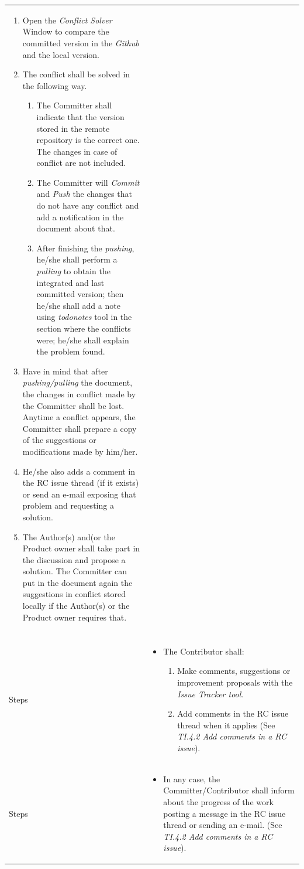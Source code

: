 \documentclass{template/openetcs_article}
\begin{document}
\begin{flushleft}
\begin{supertabular}{|m{2cm}|m{13cm}|}
\begin{itemize}
\begin{itemize}
\begin{enumerate}
\item Open the {\it Conflict Solver} Window to compare the committed version in the {\it Github} and the local version. 
\item The conflict shall be solved in the following way.
\begin{enumerate}
\item The Committer shall indicate that the version stored in the remote repository is the correct one. The changes in case of conflict are not included. 
\item The Committer will {\it Commit} and {\it Push} the changes that do not have any conflict and add a notification in the document about that. 
\item After finishing the {\it pushing}, he/she shall perform a {\it pulling} to obtain the integrated and last committed version; then he/she shall add a note using {\it todonotes} tool in the section where the conflicts were; he/she shall explain the problem found. 
\end{enumerate}
\item Have in mind that after {\it pushing/pulling} the document, the changes in conflict made by the Committer shall be lost. Anytime a conflict appears, the Committer shall prepare a copy of the suggestions or modifications made by him/her.
\item He/she also adds a comment in the RC issue thread (if it exists) or send an e-mail exposing that problem and requesting a solution.
\item The Author(s) and(or the Product owner shall take part in the discussion and propose a solution. The Committer can put in the document again the suggestions in conflict stored locally if the Author(s) or the Product owner requires that.
\end{enumerate}
\end{itemize}
\end{itemize}
\\\\\hline
Steps &
\begin{itemize}
\item The Contributor shall:
\begin{enumerate}
\item Make comments, suggestions or improvement proposals with the {\it Issue Tracker tool}.
\item Add comments in the RC issue thread when it applies (See {\it TI.4.2 Add comments in a RC issue}).
\end{enumerate}
\end{itemize}
\\\hline
Steps &
\begin{itemize}
\item In any case, the Committer/Contributor shall inform about the progress of the work posting a message in the RC issue thread or sending an e-mail. (See {\it TI.4.2 Add comments in a RC issue}).
\end{itemize}
\\\hline
\end{supertabular}
\end{flushleft}
\end{document}
